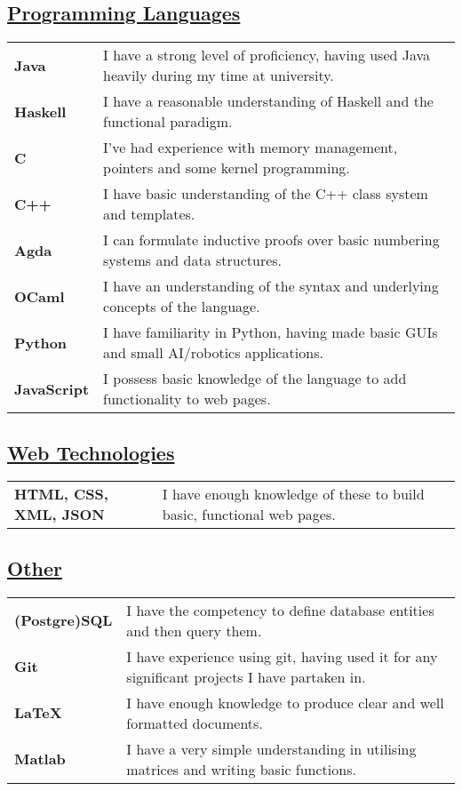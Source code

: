 \documentclass[11pt]{article}
\begin{document}
		\subsection*{\underline{Programming Languages}}
		\renewcommand{\arraystretch}{1.3}%
		\begin{tabular}[20pt]{ll}
			 \textbf{Java} &  I have a strong level of proficiency, having used Java heavily during my time at university.\\
			 \textbf{Haskell} & I have a reasonable understanding of Haskell and the functional paradigm.\\
			 \textbf{C} & I've had experience with memory management, pointers and some kernel programming. \\
			 \textbf{C++} & I have basic understanding of the C++ class system and templates. \\
			 \textbf{Agda} & I can formulate inductive proofs over basic numbering systems and data structures.\\
			 \textbf{OCaml} & I have an understanding of the syntax and underlying concepts of the language.\\
			 \textbf{Python} & I have familiarity in Python, having made basic GUIs and small AI/robotics applications. \\
			\textbf{JavaScript} &  I possess basic knowledge of the language to add functionality to web pages.\\
		\end{tabular} 
		\subsection*{\underline{Web Technologies}}
		\renewcommand{\arraystretch}{1.3}%
		\begin{tabular}{ll}
			\textbf{HTML, CSS, XML, JSON} & I have enough knowledge of these to build basic, functional web pages.\\
		\end{tabular}
		\subsection*{\underline{Other}}
		\renewcommand{\arraystretch}{1.3}%
		\begin{tabular}{ll}
			\textbf{(Postgre)SQL} & I have the competency to define database entities and then query them.\\
			 \textbf{Git} & I have experience using git, having used it for any significant projects I have partaken in.\\
			\textbf{LaTeX} & I have enough knowledge to produce clear and well formatted documents.\\
			\textbf{Matlab} & I have a very simple understanding in utilising matrices and writing basic functions.\\
		\end{tabular}
	
\end{document}

